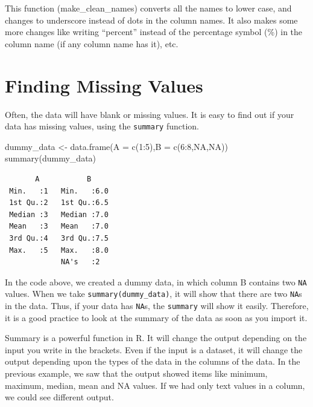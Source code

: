\documentclass[
  letterpaper,
  paper =a4,
  twoside,
  openright,
  headsepline,
  footsepline,
  listof = totocnumbered,
  chapterprefix = true,
  firstiscover,
  parskip = full*]{scrbook}
\newenvironment{Shaded}{\begin{snugshade}}{\end{snugshade}}
\newcommand{\AttributeTok}[1]{\textcolor[rgb]{0.40,0.45,0.13}{#1}}
\newcommand{\ConstantTok}[1]{\textcolor[rgb]{0.56,0.35,0.01}{#1}}
\newcommand{\DecValTok}[1]{\textcolor[rgb]{0.68,0.00,0.00}{#1}}
\newcommand{\FunctionTok}[1]{\textcolor[rgb]{0.28,0.35,0.67}{#1}}
\newcommand{\NormalTok}[1]{\textcolor[rgb]{0.00,0.23,0.31}{#1}}
\newcommand{\OtherTok}[1]{\textcolor[rgb]{0.00,0.23,0.31}{#1}}
\newcommand{\SpecialCharTok}[1]{\textcolor[rgb]{0.37,0.37,0.37}{#1}}
\begin{document}
This function (make\_clean\_names) converts all the names to lower case,
and changes to underscore instead of dots in the column names. It also
makes some more changes like writing ``percent'' instead of the
percentage symbol (\%) in the column name (if any column name has it),
etc.

\section{Finding Missing Values}\label{finding-missing-values}

Often, the data will have blank or missing values. It is easy to find
out if your data has missing values, using the \texttt{summary}
function.

\begin{Shaded}
\begin{Highlighting}[]
\NormalTok{dummy\_data }\OtherTok{\textless{}{-}} \FunctionTok{data.frame}\NormalTok{(}\AttributeTok{A =} \FunctionTok{c}\NormalTok{(}\DecValTok{1}\SpecialCharTok{:}\DecValTok{5}\NormalTok{),}\AttributeTok{B =} \FunctionTok{c}\NormalTok{(}\DecValTok{6}\SpecialCharTok{:}\DecValTok{8}\NormalTok{,}\ConstantTok{NA}\NormalTok{,}\ConstantTok{NA}\NormalTok{))}
\FunctionTok{summary}\NormalTok{(dummy\_data)}
\end{Highlighting}
\end{Shaded}

\begin{verbatim}
       A           B      
 Min.   :1   Min.   :6.0  
 1st Qu.:2   1st Qu.:6.5  
 Median :3   Median :7.0  
 Mean   :3   Mean   :7.0  
 3rd Qu.:4   3rd Qu.:7.5  
 Max.   :5   Max.   :8.0  
             NA's   :2    
\end{verbatim}

In the code above, we created a dummy data, in which column B contains
two \texttt{NA} values. When we take \texttt{summary(dummy\_data)}, it
will show that there are two \texttt{NA}s in the data. Thus, if your
data has \texttt{NA}s, the \texttt{summary} will show it easily.
Therefore, it is a good practice to look at the summary of the data as
soon as you import it.

Summary is a powerful function in R. It will change the output depending
on the input you write in the brackets. Even if the input is a dataset,
it will change the output depending upon the types of the data in the
columns of the data. In the previous example, we saw that the output
showed items like minimum, maximum, median, mean and NA values. If we
had only text values in a column, we could see different output.
\end{document}
